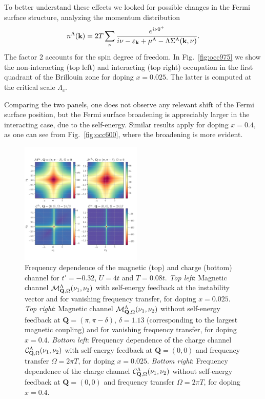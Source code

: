 To better understand these effects we looked for possible changes in the Fermi surface structure, analyzing the momentum distribution
%
\begin{equation}
 n^{\Lambda}(\mathbf{k})  = 2T \sum_{\nu}\frac{e^{i\nu 0^+}}{i\nu-\varepsilon_{\mathbf{k}}+\mu^\Lambda-\Lambda\Sigma^\Lambda(\mathbf{k},\nu)}.
 \label{eq:occ} 
\end{equation}
%
The factor $2$ accounts for the spin degree of freedom. 
In Fig.~\ref{fig:occ975} we show the non-interacting (top left) and interacting (top right) occupation in the first quadrant of the Brillouin zone for doping $x=0.025$.
The latter is computed at the critical scale $\Lambda_c$. 

Comparing the two panels, one does not observe any relevant shift of the Fermi surface position, but the Fermi surface broadening is appreciably larger in the interacting case, due to the self-energy.
Similar results apply for doping $x=0.4$, as one can see from Fig.~\ref{fig:occ600}, where the broadening is more evident.  

\begin{figure}
\hspace*{-1.0cm}
\includegraphics[width=0.52\textwidth]{images/Phi_color_all.png}
\caption{Frequency dependence of the magnetic (top) and charge (bottom) channel for $t'=-0.32$, $U=4t$ and $T=0.08t$.
\emph{Top left}:
Magnetic channel $\mathcal{M}^\Lambda_{\mathbf{Q},\Omega}(\nu_1,\nu_2)$ with self-energy feedback at the instability vector and for vanishing frequency transfer, for doping $x=0.025$.
\emph{Top right}:
Magnetic channel $\mathcal{M}^\Lambda_{\mathbf{Q},\Omega}(\nu_1,\nu_2)$ without self-energy feedback at $\mathbf{Q}=(\pi,\pi-\delta)$, $\delta=1.13$ (corresponding to the largest magnetic coupling) and for vanishing frequency transfer, for doping $x=0.4$.
\emph{Bottom left}:
Frequency dependence of the charge channel $\mathcal{C}^\Lambda_{\mathbf{Q},\Omega}(\nu_1,\nu_2)$ with self-energy feedback at $\mathbf{Q}=(0,0)$ and frequency transfer $\Omega=2\pi T$, for doping $x=0.025$.
\emph{Bottom right}:
Frequency dependence of the charge channel $\mathcal{C}^\Lambda_{\mathbf{Q},\Omega}(\nu_1,\nu_2)$ without self-energy feedback at $\mathbf{Q}=(0,0)$ and frequency transfer $\Omega=2\pi T$, for doping $x=0.4$.
}  
\label{fig:freqplot} 
\end{figure}

